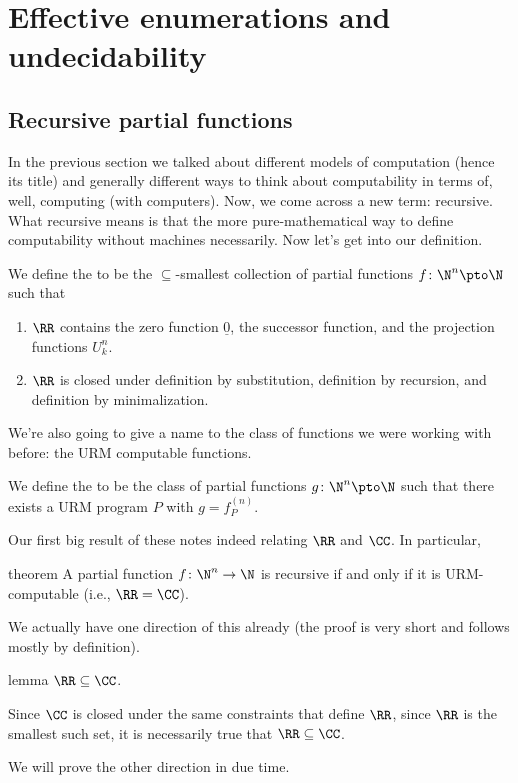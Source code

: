 \documentclass[class=article, crop=false]{standalone}
\begin{document}
\section{Effective enumerations and undecidability}

\subsection{Recursive partial functions}

In the previous section we talked about different models of computation (hence its title) and generally different ways to think about computability in terms of, well, computing (with computers). Now, we come across a new term: recursive. What recursive means is that the more pure-mathematical way to define computability without machines necessarily. Now let's get into our definition.

\begin{defn}
  We define the  to be the
  $\subseteq$-smallest collection of partial functions $f\colon \N^n \pto \N$
  such that
    \begin{enumerate}[(1)]
      \item $\RR$ contains the zero function $\underline 0$, the successor function, and the projection functions $U_k^n$.

      \item $\RR$ is closed under definition by substitution, definition by recursion, and definition by minimalization.
    \end{enumerate}
\end{defn}

We're also going to give a name to the class of functions we were working with before: the URM computable functions.

\begin{defn}
  We define the  to be the class of partial functions $g \colon \N^n \pto \N$ such that there exists a URM program $P$ with $g = f_P^{(n)}$.
\end{defn}

Our first big result of these notes indeed relating $\RR$ and $\CC$. In particular,
\begin{result}{theorem}
  A partial function $f \colon \N^n \to \N$ is recursive if and only if it is URM-computable (i.e., $\RR = \CC$).
\end{result}

We actually have one direction of this already (the proof is very short and follows mostly by definition).
\begin{result}{lemma}
  $\RR \subseteq \CC$.
\end{result}
\begin{pf}
  Since $\CC$ is closed under the same constraints that define $\RR$, since $\RR$ is the smallest such set, it is necessarily true that $\RR \subseteq \CC$.
\end{pf}
We will prove the other direction in due time.
\end{document}
